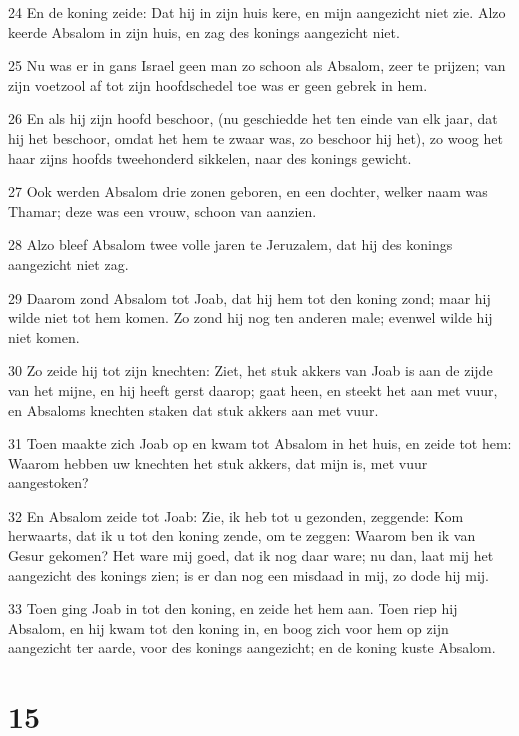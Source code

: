 \par 24 En de koning zeide: Dat hij in zijn huis kere, en mijn aangezicht niet zie. Alzo keerde Absalom in zijn huis, en zag des konings aangezicht niet.
\par 25 Nu was er in gans Israel geen man zo schoon als Absalom, zeer te prijzen; van zijn voetzool af tot zijn hoofdschedel toe was er geen gebrek in hem.
\par 26 En als hij zijn hoofd beschoor, (nu geschiedde het ten einde van elk jaar, dat hij het beschoor, omdat het hem te zwaar was, zo beschoor hij het), zo woog het haar zijns hoofds tweehonderd sikkelen, naar des konings gewicht.
\par 27 Ook werden Absalom drie zonen geboren, en een dochter, welker naam was Thamar; deze was een vrouw, schoon van aanzien.
\par 28 Alzo bleef Absalom twee volle jaren te Jeruzalem, dat hij des konings aangezicht niet zag.
\par 29 Daarom zond Absalom tot Joab, dat hij hem tot den koning zond; maar hij wilde niet tot hem komen. Zo zond hij nog ten anderen male; evenwel wilde hij niet komen.
\par 30 Zo zeide hij tot zijn knechten: Ziet, het stuk akkers van Joab is aan de zijde van het mijne, en hij heeft gerst daarop; gaat heen, en steekt het aan met vuur, en Absaloms knechten staken dat stuk akkers aan met vuur.
\par 31 Toen maakte zich Joab op en kwam tot Absalom in het huis, en zeide tot hem: Waarom hebben uw knechten het stuk akkers, dat mijn is, met vuur aangestoken?
\par 32 En Absalom zeide tot Joab: Zie, ik heb tot u gezonden, zeggende: Kom herwaarts, dat ik u tot den koning zende, om te zeggen: Waarom ben ik van Gesur gekomen? Het ware mij goed, dat ik nog daar ware; nu dan, laat mij het aangezicht des konings zien; is er dan nog een misdaad in mij, zo dode hij mij.
\par 33 Toen ging Joab in tot den koning, en zeide het hem aan. Toen riep hij Absalom, en hij kwam tot den koning in, en boog zich voor hem op zijn aangezicht ter aarde, voor des konings aangezicht; en de koning kuste Absalom.

\chapter{15}

